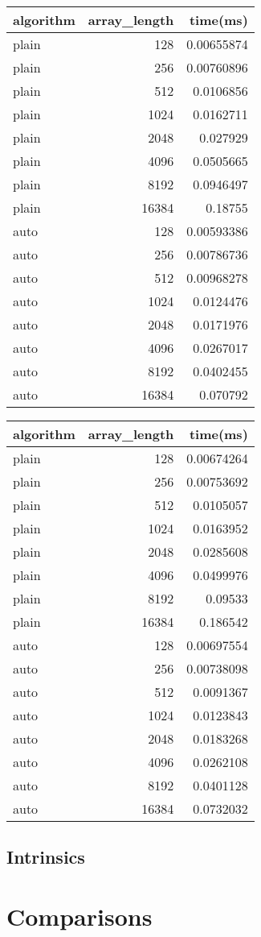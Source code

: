 \documentclass[12pt, a4paper]{article}
\begin{document}
\begin{tabular}{lrr}
\toprule
algorithm & array_length & time(ms) \\
\midrule
plain & 128 & 0.00655874 \\
plain & 256 & 0.00760896 \\
plain & 512 & 0.0106856 \\
plain & 1024 & 0.0162711 \\
plain & 2048 & 0.027929 \\
plain & 4096 & 0.0505665 \\
plain & 8192 & 0.0946497 \\
plain & 16384 & 0.18755 \\
auto & 128 & 0.00593386 \\
auto & 256 & 0.00786736 \\
auto & 512 & 0.00968278 \\
auto & 1024 & 0.0124476 \\
auto & 2048 & 0.0171976 \\
auto & 4096 & 0.0267017 \\
auto & 8192 & 0.0402455 \\
auto & 16384 & 0.070792 \\
\bottomrule
\end{tabular}

\begin{tabular}{lrr}
\toprule
algorithm & array_length & time(ms) \\
\midrule
plain & 128 & 0.00674264 \\
plain & 256 & 0.00753692 \\
plain & 512 & 0.0105057 \\
plain & 1024 & 0.0163952 \\
plain & 2048 & 0.0285608 \\
plain & 4096 & 0.0499976 \\
plain & 8192 & 0.09533 \\
plain & 16384 & 0.186542 \\
auto & 128 & 0.00697554 \\
auto & 256 & 0.00738098 \\
auto & 512 & 0.0091367 \\
auto & 1024 & 0.0123843 \\
auto & 2048 & 0.0183268 \\
auto & 4096 & 0.0262108 \\
auto & 8192 & 0.0401128 \\
auto & 16384 & 0.0732032 \\
\bottomrule
\end{tabular}

\subsection{Intrinsics}

\section{Comparisons}
\end{document}
